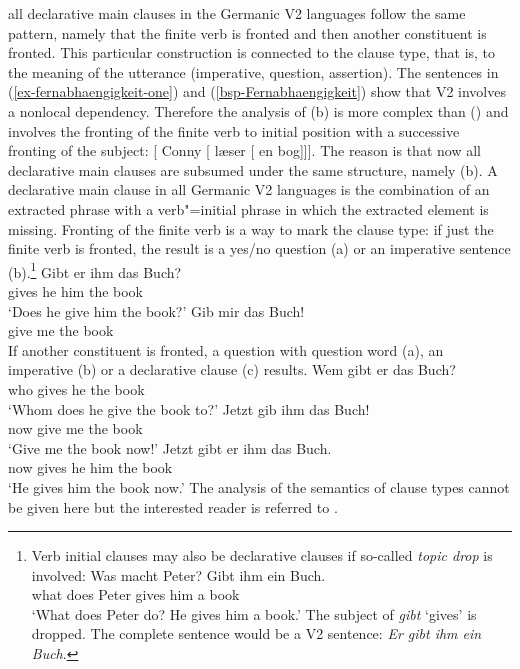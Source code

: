 all declarative main clauses in the Germanic V2 languages follow the same pattern, namely that the
finite verb is fronted and then another constituent is fronted. This particular construction is
connected to the clause type, that is, to the meaning of the utterance (imperative, question,
assertion). The sentences in (\ref{ex-fernabhaengigkeit-one}) and (\ref{bsp-Fernabhaengigkeit}) show
that V2 involves a nonlocal dependency. Therefore the analysis
of (b) is more complex than () and involves the fronting of the finite verb to initial
position with a successive fronting of the subject:
\ea
{}[ Conny [ læser [ en bog]]].
\z
The reason is that now all declarative main clauses are subsumed under the same structure, namely
(b). A declarative main clause in all Germanic V2 languages is the combination of an extracted
phrase with a verb"=initial phrase in which the extracted element is missing. Fronting of the finite
verb is a way to mark the clause type: if just the finite verb is fronted, the result is a yes/no question (a)
or an imperative sentence (b).\footnote{
  Verb initial clauses may also be declarative clauses if so-called \emph{topic drop} \citep{Fries88b} is involved:
  \ea
  \gll Was macht Peter? Gibt ihm ein Buch.\\
       what does Peter  gives him a book\\\german
  \glt `What does Peter do? He gives him a book.'
  \z
  The subject of \emph{gibt} `gives' is dropped. The complete sentence would be a V2 sentence:
  \emph{Er gibt ihm ein Buch}.
}
\eal
\ex 
\gll Gibt er ihm das Buch?\\
     gives he him the book\\\german
\glt `Does he give him the book?'
\ex 
\gll Gib mir das Buch!\\
     give me the book\\
\zl
If another constituent is fronted, a question with question word (a), an imperative
(b) or a declarative clause (c) results.
\eal
\ex 
\gll Wem gibt er das Buch?\\
     who gives he the book\\\german
\glt `Whom does he give the book to?'
\ex 
\gll Jetzt gib ihm das Buch!\\
     now give me the book\\
\glt `Give me the book now!'
\ex 
\gll Jetzt gibt er ihm das Buch.\\
     now gives he him the book\\
\glt `He gives him the book now.'
\zl
The analysis of the semantics of clause types cannot be given here but the interested reader is
referred to .


